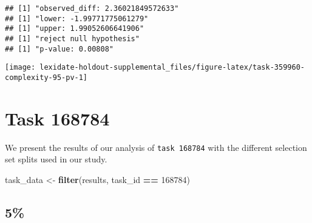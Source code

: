 \documentclass[
]{book}
\newenvironment{Shaded}{\begin{snugshade}}{\end{snugshade}}
\newcommand{\AttributeTok}[1]{\textcolor[rgb]{0.13,0.29,0.53}{#1}}
\newcommand{\DecValTok}[1]{\textcolor[rgb]{0.00,0.00,0.81}{#1}}
\newcommand{\FunctionTok}[1]{\textcolor[rgb]{0.13,0.29,0.53}{\textbf{#1}}}
\newcommand{\NormalTok}[1]{#1}
\newcommand{\OtherTok}[1]{\textcolor[rgb]{0.56,0.35,0.01}{#1}}
\newcommand{\SpecialCharTok}[1]{\textcolor[rgb]{0.81,0.36,0.00}{\textbf{#1}}}
\newcommand{\StringTok}[1]{\textcolor[rgb]{0.31,0.60,0.02}{#1}}
\begin{document}
\begin{Shaded}
\end{Shaded}

\begin{verbatim}
## [1] "observed_diff: 2.36021849572633"
## [1] "lower: -1.99771775061279"
## [1] "upper: 1.99052606641906"
## [1] "reject null hypothesis"
## [1] "p-value: 0.00808"
\end{verbatim}

\texttt{[image: lexidate-holdout-supplemental\_files/figure-latex/task-359960-complexity-95-pv-1]}

\hypertarget{task-168784}{%
\chapter{Task 168784}\label{task-168784}}

We present the results of our analysis of \texttt{task\ 168784} with the different selection set splits used in our study.

\begin{Shaded}
\begin{Highlighting}[]
\NormalTok{task\_data }\OtherTok{\textless{}{-}} \FunctionTok{filter}\NormalTok{(results, task\_id }\SpecialCharTok{==} \DecValTok{168784}\NormalTok{)}
\end{Highlighting}
\end{Shaded}

\hypertarget{section-50}{%
\section{5\%}\label{section-50}}
\end{document}

